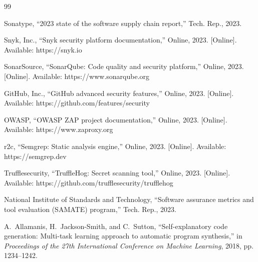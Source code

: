 \documentclass[10pt, conference, compsocconf]{IEEEtran}
\begin{document}

\begin{thebibliography}{99}

Sonatype, ``2023 state of the software supply chain report,'' Tech. Rep., 2023.

Snyk, Inc., ``Snyk security platform documentation,'' Online, 2023. [Online]. Available: https://snyk.io

SonarSource, ``SonarQube: Code quality and security platform,'' Online, 2023. [Online]. Available: https://www.sonarqube.org

GitHub, Inc., ``GitHub advanced security features,'' Online, 2023. [Online]. Available: https://github.com/features/security

OWASP, ``OWASP ZAP project documentation,'' Online, 2023. [Online]. Available: https://www.zaproxy.org

r2c, ``Semgrep: Static analysis engine,'' Online, 2023. [Online]. Available: https://semgrep.dev

Trufflesecurity, ``TruffleHog: Secret scanning tool,'' Online, 2023. [Online]. Available: https://github.com/trufflesecurity/trufflehog

National Institute of Standards and Technology, ``Software assurance metrics and tool evaluation (SAMATE) program,'' Tech. Rep., 2023.

A.~Allamanis, H.~Jackson-Smith, and C.~Sutton, ``Self-explanatory code generation: Multi-task learning approach to automatic program synthesis,'' in \textit{Proceedings of the 27th International Conference on Machine Learning}, 2018, pp. 1234--1242.

\end{thebibliography}
\end{document}
